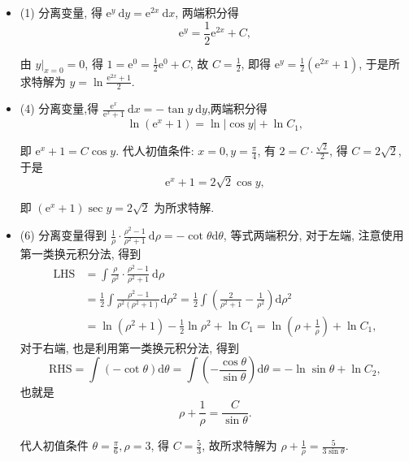 \documentclass[answer]{THUExam}
\begin{document}
\begin{solution}
    \begin{itemize}
        \item (1) 分离变量, 得 $\mathrm{e}^y \mathrm{~d} y=\mathrm{e}^{2 x} \mathrm{~d} x$, 两端积分得
              $$
                  \mathrm{e}^y=\frac{1}{2} \mathrm{e}^{2 x}+C,
              $$

              由 $\left.y\right|_{x=0}=0$, 得 $1=\mathrm{e}^0=\frac{1}{2} \mathrm{e}^0+C$, 故 $C=\frac{1}{2}$, 即得 $\mathrm{e}^y=\frac{1}{2}\left(\mathrm{e}^{2 x}+1\right)$, 于是所求特解为 $y=\ln \frac{\mathrm{e}^{2 x}+1}{2}$.
        \item (4) 分离变量,得 $\frac{\mathrm{e}^x}{\mathrm{e}^x+1} \mathrm{~d} x=-\tan y \mathrm{~d} y$,两端积分得
              $$
                  \ln \left(\mathrm{e}^x+1\right)=\ln |\cos y|+\ln C_1,
              $$

              即 $\mathrm{e}^x+1=C \cos y$. 代人初值条件: $x=0, y=\frac{\pi}{4}$, 有 $2=C \cdot \frac{\sqrt{2}}{2}$, 得 $C=2 \sqrt{2}$, 于是
              $$
                  \mathrm{e}^x+1=2 \sqrt{2} \cos y,
              $$

              即 $\left(\mathrm{e}^x+1\right) \sec y=2 \sqrt{2}$ 为所求特解.
        \item (6) 分离变量得到 $\frac{1}{\rho} \cdot \frac{\rho^2-1}{\rho^2+1} \mathrm{~d} \rho=-\cot \theta \mathrm{d} \theta$, 等式两端积分, 对于左端, 注意使用第一类换元积分法, 得到
              $$
                  \begin{aligned}
                      \text{LHS} & = \int \frac{\rho}{\rho^2} \cdot \frac{\rho^2-1}{\rho^2+1} \mathrm{~d} \rho                                                                                         \\
                                 & =\frac{1}{2} \int \frac{\rho^2-1}{\rho^2\left(\rho^2+1\right)} \mathrm{d} \rho^2=\frac{1}{2} \int\left(\frac{2}{\rho^2+1}-\frac{1}{\rho^2}\right) \mathrm{d} \rho^2 \\
                                 & =\ln \left(\rho^2+1\right)-\frac{1}{2} \ln \rho^2+\ln C_1=\ln \left(\rho+\frac{1}{\rho}\right)+\ln C_1,
                  \end{aligned}
              $$
              对于右端, 也是利用第一类换元积分法, 得到
              $$
                  \text{RHS}=\int(-\cot \theta) \mathrm{d} \theta=\int\left(-\frac{\cos \theta}{\sin \theta}\right) \mathrm{d} \theta=-\ln \sin \theta+\ln C_2,
              $$
              也就是
              $$
                  \rho+\frac{1}{\rho}=\frac{C}{\sin \theta} .
              $$

              代人初值条件 $\theta=\frac{\pi}{6}, \rho=3$, 得 $C=\frac{5}{3}$, 故所求特解为 $\rho+\frac{1}{\rho}=\frac{5}{3 \sin \theta}$.
    \end{itemize}
\end{solution}
\end{document}
